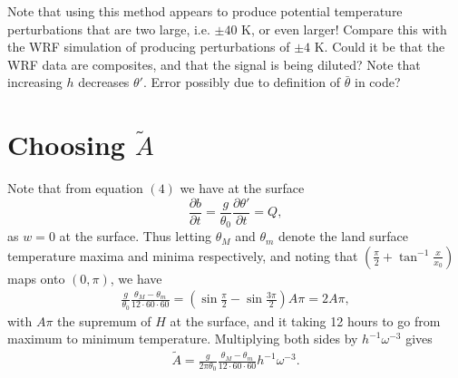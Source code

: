 \documentclass[12pt]{article}
\begin{document}
Note that using this method appears to produce potential temperature perturbations that are two large, i.e. $\pm 40$ K, or even larger! Compare this with the WRF simulation of \citet{vincent16} producing perturbations of $\pm 4$ K. Could it be that the WRF data are composites, and that the signal is being diluted? Note that increasing $h$ decreases $\theta'$. Error possibly due to definition of $\bar{\theta}$ in code? 

\section{Choosing $\tilde{A}$}
Note that from equation $(4)$ we have at the surface
\begin{equation*}
\frac{\partial b}{\partial t} = \frac{g}{\theta_0}\frac{\partial \theta'}{\partial t}= Q,
\end{equation*}
as $w=0$ at the surface. Thus letting $\theta_M$ and $\theta_m$ denote the land surface temperature maxima and minima respectively, and noting that $\left(\frac{\pi}{2} + \tan^{-1} \frac{x}{x_0} \right)$ maps onto $\left(0, \pi \right)$, we have
\begin{align*}
\frac{g}{\theta_0}\frac{\theta_M - \theta_m}{12\cdot 60\cdot 60} =  \left( \sin\frac{\pi}{2} - \sin\frac{3\pi}{2} \right)A\pi = 2 A \pi,
\end{align*}
with $A \pi$ the supremum of $H$ at the surface, and it taking 12 hours to go from maximum to minimum temperature. Multiplying both sides by $h^{-1} \omega^{-3}$ gives  
\begin{align*}
\tilde{A} = \frac{g}{2 \pi \theta_0}\frac{\theta_M - \theta_m}{12\cdot 60\cdot 60} h^{-1} \omega ^{-3}. 
\end{align*}


\end{document}

